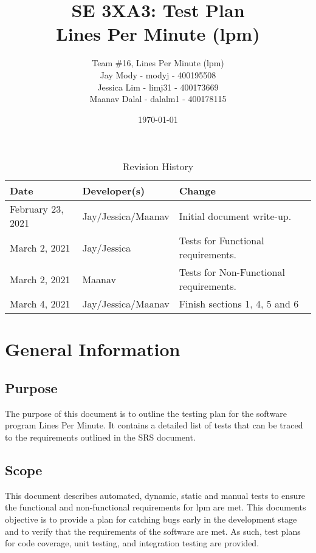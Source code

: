 \documentclass[12pt, titlepage]{article}
\title{\textbf{SE 3XA3: Test Plan}\\Lines Per Minute (lpm)}
\author{Team \#16, Lines Per Minute (lpm)\\
Jay Mody - modyj - 400195508\\
Jessica Lim - limj31 - 400173669\\
Maanav Dalal - dalalm1 - 400178115\\
}
\date{\today}
\begin{document}
\maketitle
\begin{table}[hp]
\caption{Revision History} \label{TblRevisionHistory}
\begin{tabularx}{\textwidth}{llX}
\toprule
\textbf{Date} & \textbf{Developer(s)} & \textbf{Change}\\
\midrule
February 23, 2021 & Jay/Jessica/Maanav & Initial document write-up. \\
March 2, 2021 & Jay/Jessica & Tests for Functional requirements. \\
March 2, 2021 & Maanav & Tests for Non-Functional requirements. \\
March 4, 2021 & Jay/Jessica/Maanav & Finish sections 1, 4, 5 and 6 \\
\bottomrule
\end{tabularx}
\end{table}

\newpage

\maketitle

\tableofcontents
\listoftables

\newpage


\section{General Information}

\subsection{Purpose}

The purpose of this document is to outline the testing plan for the software program Lines Per Minute. It contains a detailed list of tests that can be traced to the requirements outlined in the SRS document.

\subsection{Scope}

This document describes automated, dynamic, static and manual tests to ensure the functional and non-functional requirements for lpm are met. This documents objective is to provide a plan for catching bugs early in the development stage and to verify that the requirements of the software are met. As such, test plans for code coverage, unit testing, and integration testing are provided.
\end{document}
